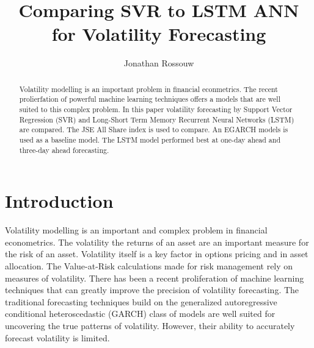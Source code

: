 \documentclass[11pt,preprint, authoryear]{elsarticle}
\numberwithin{equation}{section}
\numberwithin{figure}{section}
\numberwithin{table}{section}
\begin{document}
\begin{frontmatter}  %

\title{Comparing SVR to LSTM ANN for Volatility Forecasting}





\author[Add1]{Jonathan Rossouw}







\begin{abstract}
\small{
Volatility modelling is an important problem in financial econmetrics.
The recent prolierfation of powerful machine learning techniques offers
a models that are well suited to this complex problem. In this paper
volatility forecasting by Support Vector Regression (SVR) and Long-Short
Term Memory Recurrent Neural Networks (LSTM) are compared. The JSE All
Share index is used to compare. An EGARCH models is used as a baseline
model. The LSTM model performed best at one-day ahead and three-day
ahead forecasting.
}
\end{abstract}

\vspace{1cm}





\vspace{0.5cm}

\end{frontmatter}



\pagestyle{fancy}
\chead{}
\rhead{}
\lfoot{}
\rfoot{}
\lhead{}
\cfoot{}


\headsep 35pt %




\hypertarget{introduction}{%
\section{\texorpdfstring{Introduction
\label{Introduction}}{Introduction }}\label{introduction}}

Volatility modelling is an important and complex problem in financial
econometrics. The volatility the returns of an asset are an important
measure for the risk of an asset. Volatility itself is a key factor in
options pricing and in asset allocation. The Value-at-Risk calculations
made for risk management rely on measures of volatility. There has been
a recent proliferation of machine learning techniques that can greatly
improve the precision of volatility forecasting. The traditional
forecasting techniques build on the generalized autoregressive
conditional heteroscedastic (GARCH) class of models are well suited for
uncovering the true patterns of volatility. However, their ability to
accurately forecast volatility is limited.
\end{document}
